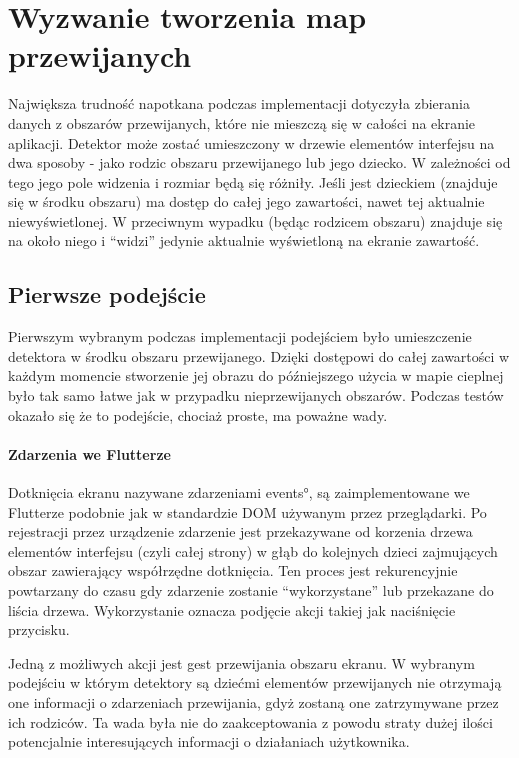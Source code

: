 \section{Wyzwanie tworzenia map przewijanych}
Największa trudność napotkana podczas implementacji dotyczyła zbierania danych z obszarów przewijanych, które nie mieszczą się w całości na ekranie aplikacji. Detektor może zostać umieszczony w drzewie elementów interfejsu na dwa sposoby - jako rodzic obszaru przewijanego lub jego dziecko. W zależności od tego jego pole widzenia i rozmiar będą się różniły. Jeśli jest dzieckiem (znajduje się w środku obszaru) ma dostęp do całej jego zawartości, nawet tej aktualnie niewyświetlonej. W przeciwnym wypadku (będąc rodzicem obszaru) znajduje się na około niego i ``widzi'' jedynie aktualnie wyświetloną na ekranie zawartość.


\subsection{Pierwsze podejście}
Pierwszym wybranym podczas implementacji podejściem było umieszczenie detektora w środku obszaru przewijanego. Dzięki dostępowi do całej zawartości w każdym momencie stworzenie jej obrazu do późniejszego użycia w mapie cieplnej było tak samo łatwe jak w przypadku nieprzewijanych obszarów. Podczas testów okazało się że to podejście, chociaż proste, ma poważne wady.

\paragraph{Zdarzenia we Flutterze}
Dotknięcia ekranu nazywane zdarzeniami \ang{events}, są zaimplementowane we Flutterze podobnie jak w standardzie DOM używanym przez przeglądarki. Po rejestracji przez urządzenie zdarzenie jest przekazywane od korzenia drzewa elementów interfejsu (czyli całej strony) w głąb do kolejnych dzieci zajmujących obszar zawierający współrzędne dotknięcia. Ten proces jest rekurencyjnie powtarzany do czasu gdy zdarzenie zostanie ``wykorzystane'' lub przekazane do liścia drzewa. Wykorzystanie oznacza podjęcie akcji takiej jak naciśnięcie przycisku.

Jedną z możliwych akcji jest gest przewijania obszaru ekranu. W wybranym podejściu w którym detektory są dziećmi elementów przewijanych nie otrzymają one informacji o zdarzeniach przewijania, gdyż zostaną one zatrzymywane przez ich rodziców. Ta wada była nie do zaakceptowania z powodu straty dużej ilości potencjalnie interesujących informacji o działaniach użytkownika.

